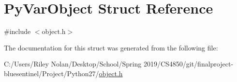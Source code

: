 \hypertarget{struct_py_var_object}{}\section{Py\+Var\+Object Struct Reference}
\label{struct_py_var_object}


{\ttfamily \#include $<$object.\+h$>$}



The documentation for this struct was generated from the following file\+:\begin{DoxyCompactItemize}
\item 
C\+:/\+Users/\+Riley Nolan/\+Desktop/\+School/\+Spring 2019/\+C\+S4850/git/finalproject-\/bluesentinel/\+Project/\+Python27/\mbox{\hyperlink{_python27_2object_8h}{object.\+h}}\end{DoxyCompactItemize}
